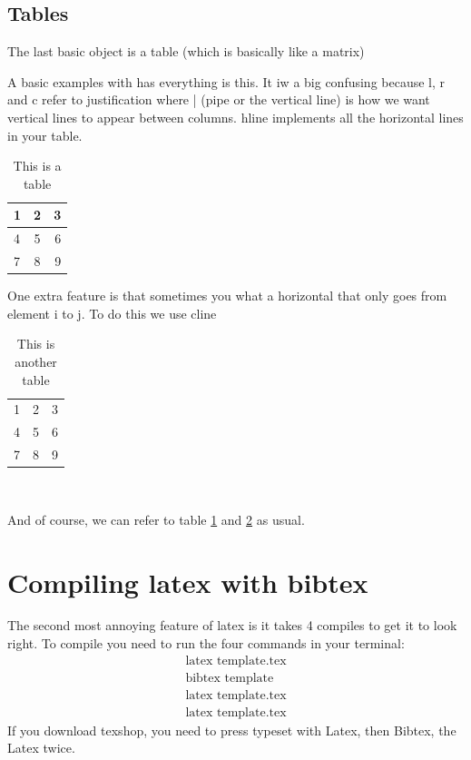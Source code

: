\documentclass[11pt]{article}
\numberwithin{equation}{section}
\def\bea{\begin{eqnarray}}
\def\eea{\end{eqnarray}}
\begin{document}
\subsection{Tables}

The last basic object is a table (which is basically like a matrix)

A basic examples with has everything is this.  It iw a big confusing because l, r and c refer to justification where | (pipe or the vertical line) is how we want vertical lines to appear between columns.  hline implements all the horizontal lines in your table. 

\begin{table}[h!]
\begin{center}
  \begin{tabular}{ | l || c ||| r  |}
    \hline
    1 & 2 & 3 \\ \hline
    4 & 5 & 6 \\ \hline \hline
    7 & 8 & 9 \\
    \hline
  \end{tabular}
\end{center}
\caption{This is a table}\label{tablename1}
\end{table}
One extra feature is that sometimes you what a horizontal that only goes from element i to j.  To do this we use cline 
\begin{table}[h!]
\begin{center}
  \begin{tabular}{ | l | c  r  |}
    \hline
    1 & 2 & 3 \\ \cline{2-3}
    4 & 5 & 6 \\ \hline 
      7 & 8 & 9 \\
    \hline
  \end{tabular}
  \
\end{center}
\caption{This is another table}\label{tablename2}
\end{table}

And of course, we can refer to table \ref{tablename1} and \ref{tablename2} as usual.
\section{Compiling latex with bibtex}

The second most annoying feature of latex is it takes 4 compiles to get it to look right.  To compile you need to run the four commands in your terminal:
\bea
&\text{latex template.tex}&\\
&\text{bibtex template}&\\
&\text{latex template.tex}&\\
&\text{latex template.tex}&
\eea
If you download texshop, you need to press typeset with Latex, then Bibtex, the Latex twice.
\end{document}
